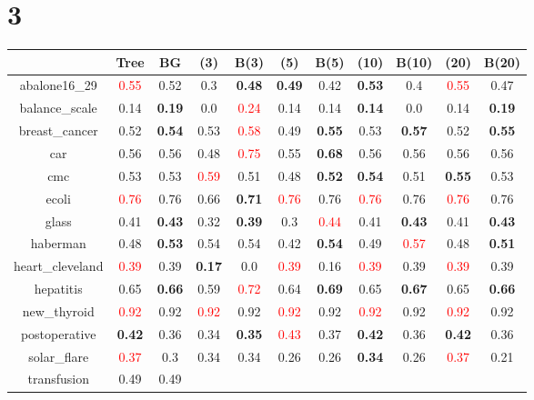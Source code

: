 \documentclass{article}%
\begin{document}
\section*{3}%
\begin{tabular}{c|cccccccccc}%
\hline%
&Tree&BG&(3)&B(3)&(5)&B(5)&(10)&B(10)&(20)&B(20)\\%
\hline%
abalone16\_29&\textcolor{red}{ 
0.55
}&0.52&0.3&\textbf{0.48}&\textbf{0.49}&0.42&\textbf{0.53}&0.4&\textcolor{red}{ 
0.55
}&0.47\\%
\hline%
balance\_scale&0.14&\textbf{0.19}&0.0&\textcolor{red}{ 
0.24
}&0.14&0.14&\textbf{0.14}&0.0&0.14&\textbf{0.19}\\%
\hline%
breast\_cancer&0.52&\textbf{0.54}&0.53&\textcolor{red}{ 
0.58
}&0.49&\textbf{0.55}&0.53&\textbf{0.57}&0.52&\textbf{0.55}\\%
\hline%
car&0.56&0.56&0.48&\textcolor{red}{ 
0.75
}&0.55&\textbf{0.68}&0.56&0.56&0.56&0.56\\%
\hline%
cmc&0.53&0.53&\textcolor{red}{ 
0.59
}&0.51&0.48&\textbf{0.52}&\textbf{0.54}&0.51&\textbf{0.55}&0.53\\%
\hline%
ecoli&\textcolor{red}{ 
0.76
}&0.76&0.66&\textbf{0.71}&\textcolor{red}{ 
0.76
}&0.76&\textcolor{red}{ 
0.76
}&0.76&\textcolor{red}{ 
0.76
}&0.76\\%
\hline%
glass&0.41&\textbf{0.43}&0.32&\textbf{0.39}&0.3&\textcolor{red}{ 
0.44
}&0.41&\textbf{0.43}&0.41&\textbf{0.43}\\%
\hline%
haberman&0.48&\textbf{0.53}&0.54&0.54&0.42&\textbf{0.54}&0.49&\textcolor{red}{ 
0.57
}&0.48&\textbf{0.51}\\%
\hline%
heart\_cleveland&\textcolor{red}{ 
0.39
}&0.39&\textbf{0.17}&0.0&\textcolor{red}{ 
0.39
}&0.16&\textcolor{red}{ 
0.39
}&0.39&\textcolor{red}{ 
0.39
}&0.39\\%
\hline%
hepatitis&0.65&\textbf{0.66}&0.59&\textcolor{red}{ 
0.72
}&0.64&\textbf{0.69}&0.65&\textbf{0.67}&0.65&\textbf{0.66}\\%
\hline%
new\_thyroid&\textcolor{red}{ 
0.92
}&0.92&\textcolor{red}{ 
0.92
}&0.92&\textcolor{red}{ 
0.92
}&0.92&\textcolor{red}{ 
0.92
}&0.92&\textcolor{red}{ 
0.92
}&0.92\\%
\hline%
postoperative&\textbf{0.42}&0.36&0.34&\textbf{0.35}&\textcolor{red}{ 
0.43
}&0.37&\textbf{0.42}&0.36&\textbf{0.42}&0.36\\%
\hline%
solar\_flare&\textcolor{red}{ 
0.37
}&0.3&0.34&0.34&0.26&0.26&\textbf{0.34}&0.26&\textcolor{red}{ 
0.37
}&0.21\\%
\hline%
transfusion&0.49&0.49&\textcolor{red}{ 
}
\end{tabular}
\end{document}
